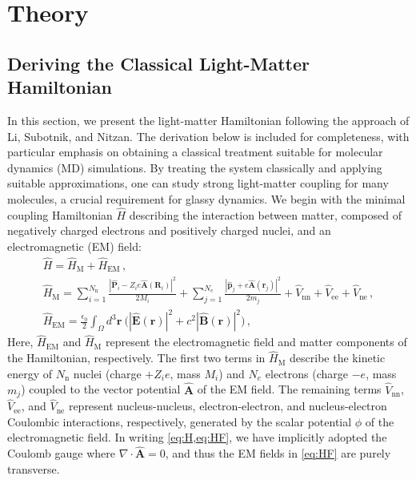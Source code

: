 \section{Theory}\label{app:theory}

\subsection{Deriving the Classical Light-Matter Hamiltonian}\label{app:hamiltonian}
In this section, we present the light-matter Hamiltonian following the approach of Li, Subotnik, and Nitzan.\cite{li2020cavity,li2021cavity} 
The derivation below is included for completeness, with particular emphasis on obtaining a classical treatment suitable for molecular dynamics (MD) simulations. 
By treating the system classically and applying suitable approximations, one can study strong light-matter coupling for many molecules, a crucial requirement for glassy dynamics.
We begin with the minimal coupling Hamiltonian $\hat{H}$ describing the interaction between matter, composed of negatively charged electrons and positively charged nuclei, and an electromagnetic (EM) field:
\begin{gather}
\hat{H} = \hat{H}_\mathrm{M}+\hat{H}_\mathrm{EM} \,, \label{eq:H}
\\
\hat{H}_\mathrm{M} = \sum_{i=1}^{N_\mathrm{n}} \frac{| \hat{\bm P}_i -Z_i e \hat{\bm A}(\bm R_i)|^2}{2 M_i} + \sum_{j=1}^{N_e} \frac{| \hat{\bm p}_j +e \hat{\bm A}(\bm r_j)|^2}{2 m_j} + \hat{V}_\mathrm{nn}+ \hat{V}_\mathrm{ee}+ \hat{V}_\mathrm{ne} \,, \label{eq:HM}
\\
\hat{H}_\mathrm{EM} = \frac{\epsilon_0}{2}\int_\Omega d^3 \bm r  \ \big( | \hat{\bm E}(\bm r)|^2+c^2 | \hat{\bm  B}(\bm r)|^2 \big) \,, \label{eq:HF}
\end{gather}
Here, $\hat{H}_\mathrm{EM}$ and $\hat{H}_\mathrm{M}$ represent the electromagnetic field and matter components of the Hamiltonian, respectively.
The first two terms in $\hat{H}_\mathrm{M}$ describe the kinetic energy of $N_\mathrm{n}$ nuclei (charge $+Z_i e$, mass $M_i$) and $N_e$ electrons (charge $-e$, mass $m_j$) coupled to the vector potential $\hat{\bm A}$ of the EM field.
The remaining terms $\hat{V}_\mathrm{nn}$, $\hat{V}_\mathrm{ee}$, and $\hat{V}_\mathrm{ne}$ represent nucleus-nucleus, electron-electron, and nucleus-electron Coulombic interactions, respectively, generated by the scalar potential $\phi$ of the electromagnetic field.
In writing \cref{eq:H,eq:HF}, we have implicitly adopted the Coulomb gauge where $\nabla \cdot \hat{\bm A} = 0$, and thus the EM fields in \cref{eq:HF} are purely transverse.

